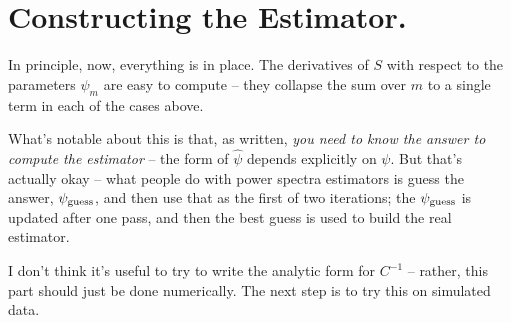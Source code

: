 \documentclass[11pt,a4paper]{article}
\begin{document}
\section{Constructing the Estimator.}
In principle, now, everything is in place. The derivatives of $S$ with
respect to the parameters $\psi_m$ are easy to compute -- they
collapse the sum over $m$ to a single term in each of the cases
above. 

What's notable about this is that, as written, {\it you need to know
  the answer to compute the estimator} -- the form of $\hat{\psi}$
depends explicitly on $\psi$. But that's actually okay -- what people
do with power spectra estimators is guess the answer, $\psi_{\rm
  guess}$, and then use that as the first of two iterations; the
$\psi_{\rm guess}$ is updated after one pass, and then the best guess
is used to build the real estimator.

I don't think it's useful to try to write the analytic form for
$C^{-1}$ -- rather, this part should just be done numerically. The
next step is to try this on simulated data.
\end{document}
